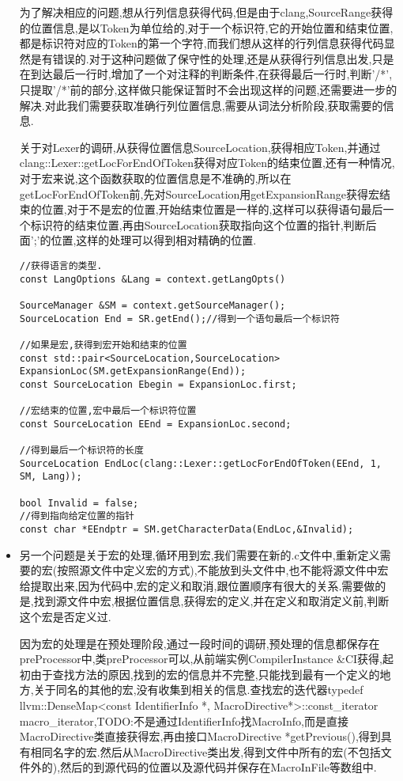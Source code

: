 \begin{itemize}
{     为了解决相应的问题,想从行列信息获得代码,但是由于clang,SourceRange获得的位置信息,是以Token为单位给的,对于一个标识符,它的开始位置和结束位置,都是标识符对应的Token的第一个字符,而我们想从这样的行列信息获得代码显然是有错误的.对于这种问题做了保守性的处理,还是从获得行列信息出发,只是在到达最后一行时,增加了一个对注释的判断条件,在获得最后一行时,判断'/*',只提取'/*'前的部分,这样做只能保证暂时不会出现这样的问题,还需要进一步的解决.对此我们需要获取准确行列位置信息,需要从词法分析阶段,获取需要的信息.
     
     
      关于对Lexer的调研,从获得位置信息SourceLocation,获得相应Token,并通过clang::Lexer::getLocForEndOfToken获得对应Token的结束位置,还有一种情况,对于宏来说,这个函数获取的位置信息是不准确的,所以在getLocForEndOfToken前,先对SourceLocation用getExpansionRange获得宏结束的位置,对于不是宏的位置,开始结束位置是一样的,这样可以获得语句最后一个标识符的结束位置,再由SourceLocation获取指向这个位置的指针,判断后面';'的位置,这样的处理可以得到相对精确的位置.

      
\begin{lstlisting}
//获得语言的类型.
const LangOptions &Lang = context.getLangOpts()

SourceManager &SM = context.getSourceManager();
SourceLocation End = SR.getEnd();//得到一个语句最后一个标识符

//如果是宏,获得到宏开始和结束的位置
const std::pair<SourceLocation,SourceLocation> ExpansionLoc(SM.getExpansionRange(End));
const SourceLocation Ebegin = ExpansionLoc.first;

//宏结束的位置,宏中最后一个标识符位置
const SourceLocation EEnd = ExpansionLoc.second;

//得到最后一个标识符的长度
SourceLocation EndLoc(clang::Lexer::getLocForEndOfToken(EEnd, 1, SM, Lang));

bool Invalid = false;
//得到指向给定位置的指针
const char *EEndptr = SM.getCharacterData(EndLoc,&Invalid);
\end{lstlisting}

     }

\item{另一个问题是关于宏的处理,循环用到宏,我们需要在新的.c文件中,重新定义需要的宏(按照源文件中定义宏的方式),不能放到头文件中,也不能将源文件中宏给提取出来,因为代码中,宏的定义和取消,跟位置顺序有很大的关系.需要做的是,找到源文件中宏,根据位置信息,获得宏的定义,并在定义和取消定义前,判断这个宏是否定义过.
     
     因为宏的处理是在预处理阶段,通过一段时间的调研,预处理的信息都保存在preProcessor中,类preProcessor可以,从前端实例CompilerInstance \&CI获得,起初由于查找方法的原因,找到的宏的信息并不完整,只能找到最有一个定义的地方,关于同名的其他的宏,没有收集到相关的信息.查找宏的迭代器typedef llvm::DenseMap<const IdentifierInfo *, MacroDirective*>::const\_iterator macro\_iterator,TODO:不是通过IdentifierInfo找MacroInfo,而是直接MacroDirective类直接获得宏,再由接口MacroDirective *getPrevious(),得到具有相同名字的宏.然后从MacroDirective类出发,得到文件中所有的宏(不包括文件外的),然后的到源代码的位置以及源代码并保存在MacroInFile等数组中.
     
}
\end{itemize}
